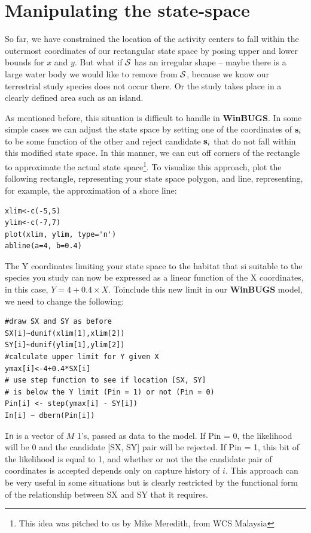 \section{Manipulating the state-space}
\label{mcmc.sec.state-space}

So far, we have constrained the location of the activity centers to fall
within the outermost coordinates of our rectangular state space by posing
upper and lower bounds for $x$ and $y$. But what if ${\cal S}$
has an irregular
shape -- maybe there is a large water body we would like to remove from
${\cal S}$, because we know our terrestrial study species does not occur there.
Or the study takes place in a clearly defined area such as an island.

As mentioned before, this situation is difficult to handle in {\bf WinBUGS}.
In some simple cases we can adjust the state space by setting one of the
coordinates of ${\bf s}_{i}$ to be some function of the other and reject candidate ${\bf s}_{i}$ that do not fall within this modified state space.
In this manner, we can cut off corners of the rectangle to approximate
the actual state space\footnote{This idea was pitched to us by Mike Meredith, from WCS Malaysia}. To visualize this approach, plot the following rectangle, representing your state space polygon, and line, representing, for example, the approximation of a shore line:
\begin{verbatim}
xlim<-c(-5,5)
ylim<-c(-7,7)
plot(xlim, ylim, type='n')
abline(a=4, b=0.4)
\end{verbatim}
The Y coordinates limiting your state space to the habitat that si suitable to the species you study can now be expressed as a linear function of the X coordinates, in this case, $Y=4+0.4 \times X$.
Toinclude this new limit in our {\bf WinBUGS} model, we need to change the following:
\begin{verbatim}
#draw SX and SY as before
SX[i]~dunif(xlim[1],xlim[2])
SY[i]~dunif(ylim[1],ylim[2])
#calculate upper limit for Y given X
ymax[i]<-4+0.4*SX[i]
# use step function to see if location [SX, SY]
# is below the Y limit (Pin = 1) or not (Pin = 0)
Pin[i] <- step(ymax[i] - SY[i])
In[i] ~ dbern(Pin[i])
\end{verbatim}
{\tt In} is a vector of $M$ 1's, passed as data to the model. If Pin = 0, the likelihood will be 0 and the candidate [SX, SY] pair will be rejected. If Pin = 1, this bit of the likelihood is equal to 1, and whether or not the the candidate pair of coordinates is accepted depends only on capture history of $i$. This approach can be very useful in some situations but is clearly restricted by the functional form of the relationship between SX and SY that it requires.

